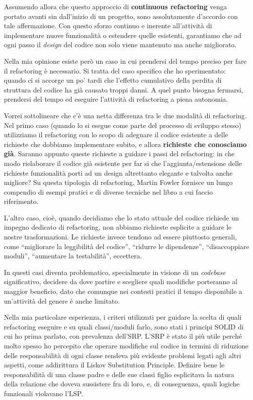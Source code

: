 \documentclass[12pt]{report}
\begin{document}
Assumendo allora che questo approccio di \textbf{continuous refactoring} venga
portato avanti sin dall'inizio di un progetto, sono 
assolutamente d'accordo con tale affermazione. Con questo 
sforzo continuo e inerente all'attività di implementare nuove 
funzionalità o estendere quelle esistenti,
garantiamo che ad ogni passo il \textit{design} del codice non solo viene
mantenuto ma anche migliorato.

Nella mia opinione esiste però un caso in cui prendersi del tempo 
preciso per fare il refactoring è necessario. Si tratta del caso specifico che
ho sperimentato: quando ci si accorge un po' tardi che l'effetto 
cumulativo della perdita di struttura del codice ha già causato
troppi danni. A quel punto bisogna fermarsi, prendersi del tempo 
ed eseguire l'attività di refactoring a piena autonomia.

Vorrei sottolineare che c'è una netta differenza tra le due modalità
di refactoring. Nel primo caso (quando lo si esegue come
parte del processo di sviluppo stesso) utilizziamo il refactoring con lo
scopo di adeguare il codice esistente a delle richieste 
che dobbiamo implementare subito, e allora \textbf{richieste che conosciamo 
già}. Saranno appunto queste richieste a guidare 
i passi del refactoring: in che modo rielaborare il codice già esistente
per far si che l'aggiunta/estensione delle richieste funzionalità porti 
ad un design altrettanto elegante e talvolta anche migliore? 
Su questa tipologia di refactoring, Martin Fowler fornisce un lungo 
compendio di esempi pratici e di diverse
tecniche nel libro a cui faccio riferimento\cite{fowler2002}.

L'altro caso, cioè, quando decidiamo che lo stato attuale del codice
richiede un impegno dedicato di refactoring, non abbiamo richieste esplicite
a guidare le nostre trasformazioni. Le richieste invece tendono ad essere
piuttosto generali, come ``migliorare la leggibilità del codice'', ``ridurre
le dipendenze'', ``disaccoppiare moduli'', ``aumentare la testabilità'',
eccettera.

In questi casi diventa problematico, specialmente in visione di un
\textit{codebase} significativo, decidere da dove partire e scegliere
quali modifiche porteranno al maggior beneficio, dato che comunque
nei contesti pratici il tempo disponibile a un'attività del genere è 
anche limitato.

Nella mia particolare esperienza, i criteri utilizzati per guidare la scelta
di quali refactoring eseguire e su quali classi/moduli farlo, sono stati i
principi SOLID di cui ho prima parlato, con prevalenza dell'SRP. L'SRP è
stato il più utile perché molto spesso ho percepito che operare modifiche
sul codice in termini di riduzione delle responsabilità di ogni classe
rendeva più evidente problemi legati agli altri aspetti, come addirittura
il Liskov Substitution Principle. Definire bene le responsabilità di una classe
padre e delle sue classi figlio esplicitava la natura della relazione che
doveva sussistere fra di loro, e, di conseguenza, quali logiche funzionali
violavano l'LSP. 
\end{document}

